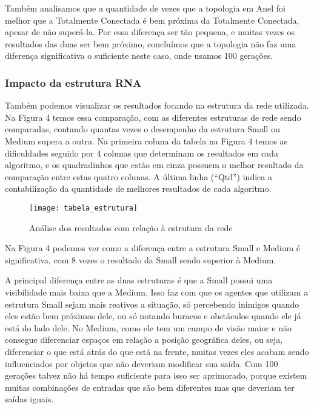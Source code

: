 \documentclass[a4paper,12pt]{article}
\begin{document}
      Também analisamos que a quantidade de vezes que a topologia em Anel foi melhor que 
      a Totalmente Conectada é bem próxima da Totalmente Conectada, apesar de não superá-la. 
      Por essa diferença ser tão pequena, e muitas vezes os resultados das duas ser 
      bem próximo, concluímos que a topologia não faz uma diferença significativa o 
      suficiente neste caso, onde usamos 100 gerações.

    \subsubsection{Impacto da estrutura RNA}
    
      Também podemos visualizar os resultados focando na estrutura da rede utilizada. 
      Na Figura 4 temos essa comparação, com as diferentes estruturas de rede sendo 
      comparadas, contando quantas vezes o desempenho da estrutura Small ou Medium 
      supera a outra. Na primeira coluna da tabela na Figura 4 temos as dificuldades seguido 
      por 4 colunas que determinam os resultados em cada algoritmo, e os quadradinhos 
      que estão em cinza possuem o melhor resultado da comparação entre estas quatro 
      colunas. A última linha (“Qtd”) indica a contabilização da quantidade de melhores 
      resultados de cada algoritmo.

      \begin{figure}[!htb]
	\centering
	\texttt{[image: tabela\_estrutura]}
	\caption{Análise dos resultados com relação à estrutura da rede}
	\label{Figura 4}
      \end{figure}
      
      Na Figura 4 podemos ver como a diferença entre a estrutura Small e Medium é 
      significativa, com 8 vezes o resultado da Small sendo superior à Medium.
      
      A principal diferença entre as duas estruturas é que a Small possui uma 
      visibilidade mais baixa que a Medium. Isso faz com que os agentes que 
      utilizam a estrutura Small sejam mais reativos a situação, só percebendo 
      inimigos quando eles estão bem próximos dele, ou só notando buracos e obstáculos 
      quando ele já está do lado dele. No Medium, como ele tem um campo de visão maior 
      e não consegue diferenciar espaços em relação a posição geográfica deles, ou 
      seja, diferenciar o que está atrás do que está na frente, muitas vezes eles 
      acabam sendo influenciados por objetos que não deveriam modificar sua saída. 
      Com 100 gerações talvez não há tempo suficiente para isso ser aprimorado, porque 
      existem muitas combinações de entradas que são bem diferentes mas que deveriam 
      ter saídas iguais.
\end{document}
